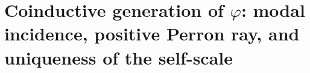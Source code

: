 \chapter{Coinductive generation of \(\varphi\): modal incidence, positive Perron ray, and uniqueness of the self-scale}
\label{chap:p3-final:30:generacion_phi}

